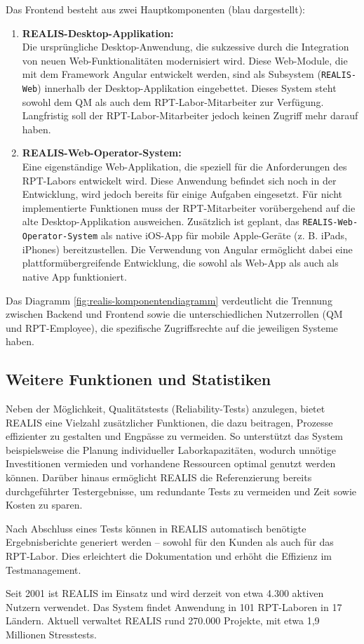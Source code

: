 Das Frontend besteht aus zwei Hauptkomponenten (blau dargestellt):
\begin{enumerate}
    \item \textbf{REALIS-Desktop-Applikation:} \\
Die ursprüngliche Desktop-Anwendung, die sukzessive durch die Integration von neuen Web-Funktionalitäten modernisiert wird. Diese Web-Module, die mit dem Framework Angular entwickelt werden, sind als Subsystem (\texttt{REALIS-Web}) innerhalb der Desktop-Applikation eingebettet. Dieses System steht sowohl dem \gls{QM} als auch dem \gls{RPT}-Labor-Mitarbeiter zur Verfügung. Langfristig soll der \gls{RPT}-Labor-Mitarbeiter jedoch keinen Zugriff mehr darauf haben.

\item \textbf{REALIS-Web-Operator-System:} \\
Eine eigenständige Web-Applikation, die speziell für die Anforderungen des \gls{RPT}-Labors entwickelt wird. Diese Anwendung befindet sich noch in der Entwicklung, wird jedoch bereits für einige Aufgaben eingesetzt. Für nicht implementierte Funktionen muss der \gls{RPT}-Mitarbeiter vorübergehend auf die alte Desktop-Applikation ausweichen. Zusätzlich ist geplant, das \texttt{REALIS-Web-Operator-System} als native iOS-App für mobile Apple-Geräte (z. B. iPads, iPhones) bereitzustellen. Die Verwendung von Angular ermöglicht dabei eine plattformübergreifende Entwicklung, die sowohl als Web-App als auch als native App funktioniert.
\end{enumerate}

Das Diagramm \ref{fig:realis-komponentendiagramm} verdeutlicht die Trennung zwischen Backend und Frontend sowie die unterschiedlichen Nutzerrollen (\gls{QM} und \gls{RPT}-Employee), die spezifische Zugriffsrechte auf die jeweiligen Systeme haben.


\subsection{Weitere Funktionen und Statistiken}
Neben der Möglichkeit, Qualitätstests (Reliability-Tests) anzulegen, bietet \gls{REALIS} eine Vielzahl zusätzlicher Funktionen, die dazu beitragen, Prozesse effizienter zu gestalten und Engpässe zu vermeiden. So unterstützt das System beispielsweise die Planung individueller Laborkapazitäten, wodurch unnötige Investitionen vermieden und vorhandene Ressourcen optimal genutzt werden können. Darüber hinaus ermöglicht \gls{REALIS} die Referenzierung bereits durchgeführter Testergebnisse, um redundante Tests zu vermeiden und Zeit sowie Kosten zu sparen.

Nach Abschluss eines Tests können in \gls{REALIS} automatisch benötigte Ergebnisberichte generiert werden – sowohl für den Kunden als auch für das \gls{RPT}-Labor. Dies erleichtert die Dokumentation und erhöht die Effizienz im Testmanagement.

Seit 2001 ist \gls{REALIS} im Einsatz und wird derzeit von etwa 4.300 aktiven Nutzern verwendet. Das System findet Anwendung in 101 \gls{RPT}-Laboren in 17 Ländern. Aktuell verwaltet \gls{REALIS} rund 270.000 Projekte, mit etwa 1,9 Millionen Stresstests.